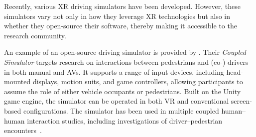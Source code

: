 \documentclass[sigconf, screen]{acmart}
\begin{document}
Recently, various XR driving simulators have been developed. However, these simulators vary not only in how they leverage XR technologies but also in whether they open-source their software, thereby making it accessible to the research community.

An example of an open-source driving simulator is provided by \citet{bazilinskyy_coupled_2020}. Their \textit{Coupled Simulator} targets research on interactions between pedestrians and (co-) drivers in both manual and \glspl{AV}. It supports a range of input devices, including head-mounted displays, motion suits, and game controllers, allowing participants to assume the role of either vehicle occupants or pedestrians. Built on the Unity game engine, the simulator can be operated in both \gls{VR} and conventional screen-based configurations. The simulator has been used in multiple coupled human–human interaction studies, including investigations of driver–pedestrian encounters~\cite{bazilinskyy2022get,mok2022stopping}.
\end{document}
